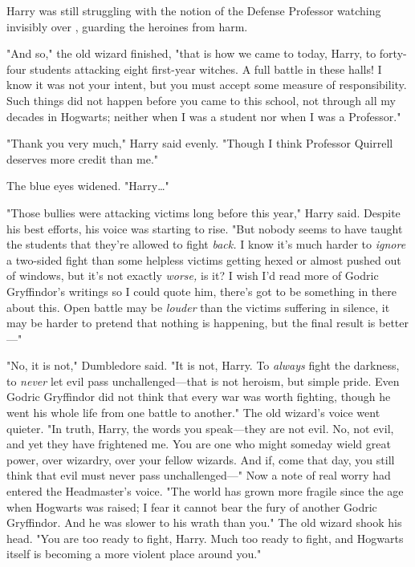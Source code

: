 Harry was still struggling with the notion of the Defense Professor watching 
invisibly over \SPHEW, guarding the heroines from harm.

"And so," the old wizard finished, "that is how we came to today, Harry, to 
forty-four students attacking eight first-year witches. A full battle in these 
halls! I know it was not your intent, but you must accept some measure of 
responsibility. Such things did not happen before you came to this school, not 
through all my decades in Hogwarts; neither when I was a student nor when I was 
a Professor."

"Thank you very much," Harry said evenly. "Though I think Professor Quirrell 
deserves more credit than me."

The blue eyes widened. "Harry{\ldots}"

"Those bullies were attacking victims long before this year," Harry said. 
Despite his best efforts, his voice was starting to rise. "But nobody seems to 
have taught the students that they're allowed to fight \emph{back.} I know it's 
much harder to \emph{ignore} a two-sided fight than some helpless victims 
getting hexed or almost pushed out of windows, but it's not exactly 
\emph{worse,} is it? I wish I'd read more of Godric Gryffindor's writings so I 
could quote him, there's got to be something in there about this. Open battle 
may be \emph{louder} than the victims suffering in silence, it may be harder to 
pretend that nothing is happening, but the final result is better---"

"No, it is not," Dumbledore said. "It is not, Harry. To \emph{always} fight the 
darkness, to \emph{never} let evil pass unchallenged---that is not heroism, but 
simple pride. Even Godric Gryffindor did not think that every war was worth 
fighting, though he went his whole life from one battle to another." The old 
wizard's voice went quieter. "In truth, Harry, the words you speak---they are 
not evil. No, not evil, and yet they have frightened me. You are one who might 
someday wield great power, over wizardry, over your fellow wizards. And if, 
come that day, you still think that evil must never pass unchallenged---" Now a 
note of real worry had entered the Headmaster's voice. "The world has grown 
more fragile since the age when Hogwarts was raised; I fear it cannot bear the 
fury of another Godric Gryffindor. And he was slower to his wrath than you." 
The old wizard shook his head. "You are too ready to fight, Harry. Much too 
ready to fight, and Hogwarts itself is becoming a more violent place around 
you."

